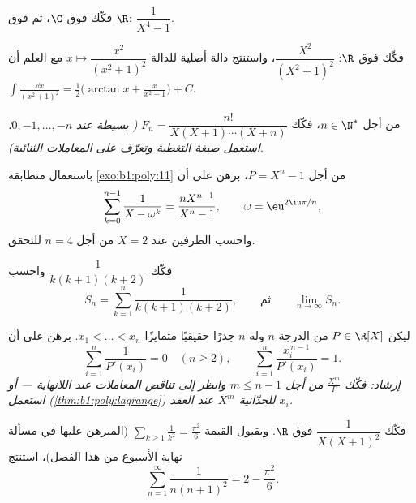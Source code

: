 \begin{exercise}[$\star\star$]\label{exo:b1:fractions:4}
فكّك فوق $\C$، ثم فوق $\R$: $\dfrac{1}{X^4 - 1}$.
\end{exercise}

\begin{exercise}[$\star\star$]\label{exo:b1:fractions:5}
فكّك فوق $\R$: $\dfrac{X^2}{(X^2 + 1)^2}$، واستنتج
دالة أصلية للدالة $x \mapsto \dfrac{x^2}{(x^2+1)^2}$ مع العلم أن
$\int \frac{\dd x}{(x^2+1)^2} = \frac12\bigl(\arctan x +
\frac{x}{x^2+1}\bigr) + C$.
\end{exercise}

\begin{exercise}[$\star\star$]\label{exo:b1:fractions:6}
من أجل $n \in \N^*$، فكّك $F_n = \dfrac{n!}{X(X+1)\cdots(X+n)}$
\emph{( بسيطة عند $0, -1, \dots, -n$؛ استعمل صيغة التغطية
وتعرّف على المعاملات الثنائية)}.
\end{exercise}

\begin{exercise}[$\star\star$]\label{exo:b1:fractions:7}
باستعمال متطابقة \cref{exo:b1:poly:11} من أجل $P = X^n - 1$،
برهن على أن
\[
\sum_{k=0}^{n-1} \frac{1}{X - \omega^k} = \frac{n X^{n-1}}{X^n - 1},
\qquad \omega = \eu^{2\iu\pi/n},
\]
واحسب الطرفين عند $X = 2$ من أجل $n = 4$ للتحقق.
\end{exercise}

\begin{exercise}[$\star\star$]\label{exo:b1:fractions:8}
فكّك $\dfrac{1}{k(k+1)(k+2)}$ واحسب
\[
S_n = \sum_{k=1}^{n} \frac{1}{k(k+1)(k+2)},
\qquad\text{ثم}\qquad
\lim_{n \to \infty} S_n .
\]
\end{exercise}

\begin{exercise}[$\star\star\star$]\label{exo:b1:fractions:9}
ليكن $P \in \R[X]$  من الدرجة $n$ وله $n$ جذرًا حقيقيًا متمايزًا
$x_1 < \dots < x_n$. برهن على أن
\[
\sum_{i=1}^{n} \frac{1}{P'(x_i)} = 0 \quad (n \geq 2),
\qquad
\sum_{i=1}^{n} \frac{x_i^{\,n-1}}{P'(x_i)} = 1 .
\]
\emph{إرشاد: فكّك $\frac{X^m}{P}$ من أجل $m \leq n - 1$ وانظر إلى
تناقص المعاملات عند اللانهاية --- أو استعمل 
(\cref{thm:b1:poly:lagrange}) للحدّانية $X^m$ عند العقد
$x_i$.}
\end{exercise}

\begin{exercise}[$\star\star$]\label{exo:b1:fractions:10}
فكّك $\dfrac{1}{X(X+1)^2}$ فوق $\R$. وبقبول القيمة
$\sum_{k \geq 1} \frac1{k^2} = \frac{\pi^2}6$ (المبرهن عليها في مسألة نهاية الأسبوع
من هذا الفصل)، استنتج
\[
\sum_{n=1}^{\infty} \frac{1}{n(n+1)^2} = 2 - \frac{\pi^2}{6} .
\]
\end{exercise}

